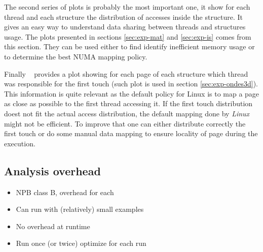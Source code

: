 The second series of plots is probably the most important one, it show for
each thread and each structure the distribution of accesses inside the
structure. It gives an easy way to understand data sharing between threads and
structures usage. The plots presented in sections \ref{sec:exp-mat} and
\ref{sec:exp-is} comes from this section. They can be used either to
find identify inefficient memory usage or to determine the best NUMA mapping
policy.

Finally \TABARNAC~ provides a plot showing for each page of each structure
which thread was responsible for the first touch (such plot is used in section
\ref{sec:exp-ondes3d}). This information is quite relevant as the default
policy for Linux is to map a page as close as possible to the first thread
accessing it. If the first touch distribution doest not fit the actual access
distribution, the default mapping done by \emph{Linux} might not be efficient.
To improve that one can either distribute correctly the first touch or do some
manual data mapping to ensure locality of page during the execution.

\subsection{Analysis overhead}
\label{sec:expe-overhead}
\begin{itemize}
    \item NPB class B, overhead for each
    \item Can run with (relatively) small  examples
    \item No overhead at runtime
    \item Run once (or twice) optimize for each run
\end{itemize}
